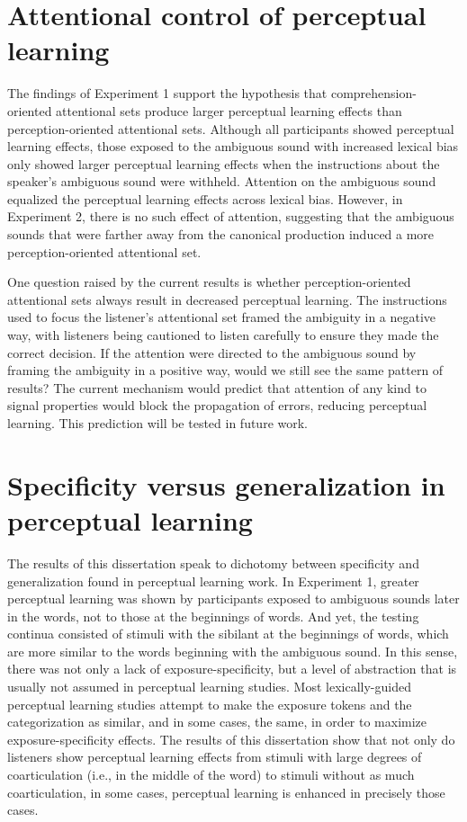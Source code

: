 \section{Attentional control of perceptual learning}

The findings of Experiment 1 support the hypothesis that comprehension-oriented attentional sets produce larger perceptual learning effects than perception-oriented attentional sets.  
Although all participants showed perceptual learning effects, those exposed to the ambiguous sound with increased lexical bias only showed larger perceptual learning effects when the instructions about the speaker's ambiguous sound were withheld.  
Attention on the ambiguous sound equalized the perceptual learning effects across lexical bias.
However, in Experiment 2, there is no such effect of attention, suggesting that the ambiguous sounds that were farther away from the canonical production induced a more perception-oriented attentional set.

One question raised by the current results is whether perception-oriented attentional sets always result in decreased perceptual learning.  
The instructions used to focus the listener's attentional set framed the ambiguity in a negative way, with listeners being cautioned to listen carefully to ensure they made the correct decision.  
If the attention were directed to the ambiguous sound by framing the ambiguity in a positive way, would we still see the same pattern of results?
The current mechanism would predict that attention of any kind to signal properties would block the propagation of errors, reducing perceptual learning.
This prediction will be tested in future work.

\section{Specificity versus generalization in perceptual learning}

The results of this dissertation speak to dichotomy between specificity and generalization found in perceptual learning work. 
In Experiment 1, greater perceptual learning was shown by participants exposed to ambiguous sounds later in the words, not to those at the beginnings of words. 
And yet, the testing continua consisted of stimuli with the sibilant at the beginnings of words, which are more similar to the words beginning with the ambiguous sound.
In this sense, there was not only a lack of exposure-specificity, but a level of abstraction that is usually not assumed in perceptual learning studies.
Most lexically-guided perceptual learning studies attempt to make the exposure tokens and the categorization as similar, and in some cases, the same, in order to maximize exposure-specificity effects.
The results of this dissertation show that not only do listeners show perceptual learning effects from stimuli with large degrees of coarticulation (i.e., in the middle of the word) to stimuli without as much coarticulation, in some cases, perceptual learning is enhanced in precisely those cases.

